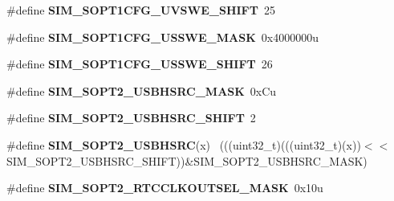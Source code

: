 \begin{DoxyCompactItemize}
\item 
\hypertarget{group___s_i_m___register___masks_ga74d94a9794e03091f54b76a5c18c58b8}{}\#define {\bfseries S\+I\+M\+\_\+\+S\+O\+P\+T1\+C\+F\+G\+\_\+\+U\+V\+S\+W\+E\+\_\+\+S\+H\+I\+F\+T}~25\label{group___s_i_m___register___masks_ga74d94a9794e03091f54b76a5c18c58b8}

\item 
\hypertarget{group___s_i_m___register___masks_ga0b7d9fe471d5d689ba3feb001cf69b60}{}\#define {\bfseries S\+I\+M\+\_\+\+S\+O\+P\+T1\+C\+F\+G\+\_\+\+U\+S\+S\+W\+E\+\_\+\+M\+A\+S\+K}~0x4000000u\label{group___s_i_m___register___masks_ga0b7d9fe471d5d689ba3feb001cf69b60}

\item 
\hypertarget{group___s_i_m___register___masks_ga6984c7260abd4b7caccff970332eb4be}{}\#define {\bfseries S\+I\+M\+\_\+\+S\+O\+P\+T1\+C\+F\+G\+\_\+\+U\+S\+S\+W\+E\+\_\+\+S\+H\+I\+F\+T}~26\label{group___s_i_m___register___masks_ga6984c7260abd4b7caccff970332eb4be}

\item 
\hypertarget{group___s_i_m___register___masks_ga34ef07b09b82ea36d35ed48d64702086}{}\#define {\bfseries S\+I\+M\+\_\+\+S\+O\+P\+T2\+\_\+\+U\+S\+B\+H\+S\+R\+C\+\_\+\+M\+A\+S\+K}~0x\+Cu\label{group___s_i_m___register___masks_ga34ef07b09b82ea36d35ed48d64702086}

\item 
\hypertarget{group___s_i_m___register___masks_ga118013fb563d406f8a5ca4f31797b6e1}{}\#define {\bfseries S\+I\+M\+\_\+\+S\+O\+P\+T2\+\_\+\+U\+S\+B\+H\+S\+R\+C\+\_\+\+S\+H\+I\+F\+T}~2\label{group___s_i_m___register___masks_ga118013fb563d406f8a5ca4f31797b6e1}

\item 
\hypertarget{group___s_i_m___register___masks_gac64d3afcb767a40f7e52321302ea5069}{}\#define {\bfseries S\+I\+M\+\_\+\+S\+O\+P\+T2\+\_\+\+U\+S\+B\+H\+S\+R\+C}(x)                                      ~(((uint32\+\_\+t)(((uint32\+\_\+t)(x))$<$$<$S\+I\+M\+\_\+\+S\+O\+P\+T2\+\_\+\+U\+S\+B\+H\+S\+R\+C\+\_\+\+S\+H\+I\+F\+T))\&S\+I\+M\+\_\+\+S\+O\+P\+T2\+\_\+\+U\+S\+B\+H\+S\+R\+C\+\_\+\+M\+A\+S\+K)\label{group___s_i_m___register___masks_gac64d3afcb767a40f7e52321302ea5069}

\item 
\hypertarget{group___s_i_m___register___masks_ga4ecc21f62a92e94e5f507a6bb5e44062}{}\#define {\bfseries S\+I\+M\+\_\+\+S\+O\+P\+T2\+\_\+\+R\+T\+C\+C\+L\+K\+O\+U\+T\+S\+E\+L\+\_\+\+M\+A\+S\+K}~0x10u\label{group___s_i_m___register___masks_ga4ecc21f62a92e94e5f507a6bb5e44062}


\end{DoxyCompactItemize}
